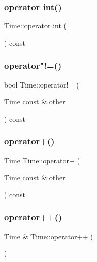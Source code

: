 \subsubsection{\texorpdfstring{operator int()}{operator int()}}
{\footnotesize\ttfamily Time\+::operator int (\begin{DoxyParamCaption}{ }\end{DoxyParamCaption}) const}

\mbox{\label{classTime_a04c5a1b7338a14253ab3797afe39316d}} 
\subsubsection{\texorpdfstring{operator"!=()}{operator!=()}}
{\footnotesize\ttfamily bool Time\+::operator!= (\begin{DoxyParamCaption}\item[{\hyperlink{classTime}{Time} const \&}]{other }\end{DoxyParamCaption}) const}

\mbox{\label{classTime_ace5e47a96c86c077b4e42b6713ae70de}} 
\subsubsection{\texorpdfstring{operator+()}{operator+()}}
{\footnotesize\ttfamily \hyperlink{classTime}{Time} Time\+::operator+ (\begin{DoxyParamCaption}\item[{\hyperlink{classTime}{Time} const \&}]{other }\end{DoxyParamCaption}) const}

\mbox{\label{classTime_a55e7ec82d5f390aa1896084e25a0f5a5}} 
\subsubsection{\texorpdfstring{operator++()}{operator++()}\hspace{0.1cm}{\footnotesize\ttfamily [1/2]}}
{\footnotesize\ttfamily \hyperlink{classTime}{Time} \& Time\+::operator++ (\begin{DoxyParamCaption}{ }\end{DoxyParamCaption})}


